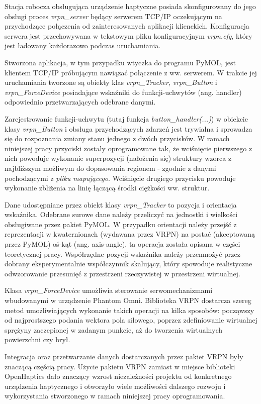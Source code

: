 \documentclass[licencjacka]{pracamgr}
\begin{document}
Stacja robocza obsługująca urządzenie haptyczne posiada skonfigurowany do jego obsługi proces \textit{vrpn\_server} będący serwerem TCP/IP oczekującym na przychodzące połączenia od zainteresowanych aplikacji klienckich. Konfiguracja serwera jest przechowywana w tekstowym pliku konfiguracyjnym \textit{vrpn.cfg}, który jest ładowany każdorazowo podczas uruchamiania. 

Stworzona aplikacja, w tym przypadku wtyczka do programu PyMOL, jest klientem TCP/IP próbującym nawiązać połączenie z ww. serwerem. W trakcie jej uruchamiania tworzone są obiekty klas \textit{vrpn\_Tracker}, \textit{vrpn\_Button} i \textit{vrpn\_ForceDevice} posiadające wskaźniki do funkcji-uchwytów (ang. handler) odpowiednio przetwarzających odebrane danymi.

Zarejestrowanie funkcji-uchwytu (tutaj funkcja \textit{button\_handler(...)}) w obiekcie klasy \textit{vrpn\_Button} i obsługa przychodzących zdarzeń jest trywialna i sprowadza się do rozpoznania zmiany stanu jednego z dwóch przycisków. W ramach niniejszej pracy przyciski zostały oprogramowane tak, że wciśnięcie pierwszego z nich powoduje wykonanie superpozycji (nałożenia się) struktury wzorca z najbliższym możliwym do dopasowania regionem - zgodnie z danymi pochodzącymi z \textit{pliku mapującego}. Wciśnięcie drugiego przycisku powoduje wykonanie zbliżenia na linię łączącą środki ciężkości ww. struktur.

Dane udostępniane przez obiekt klasy \textit{vrpn\_Tracker} to pozycja i orientacja wskaźnika. Odebrane surowe dane należy przeliczyć na jednostki i wielkości obsługiwane przez pakiet PyMOL. W przypadku orientacji należy przejść z reprezentacji w kwaternionach (wydawana przez VRPN) na postać (akceptowaną przez PyMOL) oś-kąt (ang. axis-angle), ta operacja została opisana w części teoretycznej pracy. Współrzędne pozycji wskaźnika należy przemnożyć przez dobrany eksperymentalnie współczynnik skalujący, który spowoduje realistyczne odwzorowanie przesunięć z przestrzeni rzeczywistej w przestrzeni wirtualnej.

Klasa \textit{vrpn\_ForceDevice} umożliwia sterowanie serwomechanizmami wbudowanymi w urządzenie Phantom Omni. Biblioteka VRPN dostarcza szereg metod umożliwiających wykonanie takich operacji na kilka sposobów: począwszy od najprostszego podania wektora pola siłowego, poprzez zdefiniowanie wirtualnej sprężyny zaczepionej w zadanym punkcie, aż do tworzenia wirtualnych powierzchni czy brył.

Integracja oraz przetwarzanie danych dostarczanych przez pakiet VRPN były znaczącą częścią pracy. Użycie pakietu VRPN zamiast w miejsce biblioteki OpenHaptics dało znaczący wzrost niezależności projektu od konkretnego urządzenia haptycznego i otworzyło wiele możliwości dalszego rozwoju i wykorzystania stworzonego w ramach niniejszej pracy oprogramowania. 
\end{document}
